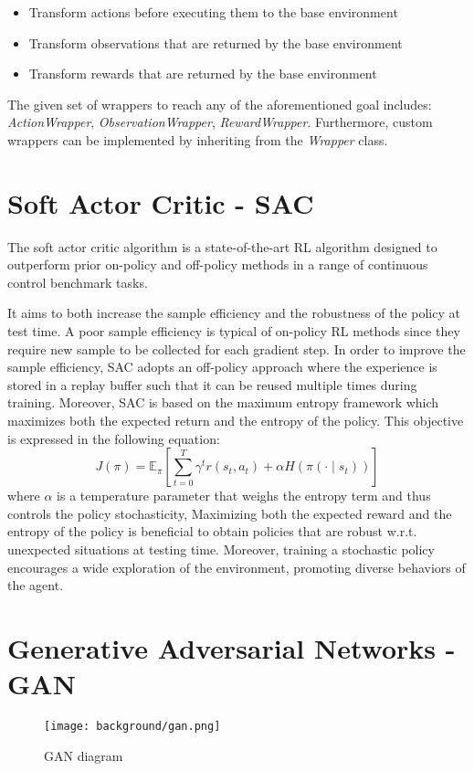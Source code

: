 \begin{itemize}
  \item Transform actions before executing them to the base environment
  \item Transform observations that are returned by the base environment
  \item Transform rewards that are returned by the base environment
\end{itemize}
The given set of wrappers to reach any of the aforementioned goal includes: \textit{ActionWrapper}, \textit{ObservationWrapper}, \textit{RewardWrapper}. Furthermore, custom wrappers can be implemented by inheriting from the \textit{Wrapper} class.

\section{Soft Actor Critic - SAC}
The soft actor critic algorithm \citep{art:sac} is a state-of-the-art RL algorithm designed to outperform prior on-policy and off-policy methods in a range of continuous control benchmark tasks. 

It aims to both increase the sample efficiency and the robustness of the policy at test time. A poor sample efficiency is typical of on-policy RL methods since they require new sample to be collected for each gradient step. In order to improve the sample efficiency, SAC adopts an off-policy approach where the experience is stored in a replay buffer such that it can be reused multiple times during training. Moreover, SAC is based on the maximum entropy framework which maximizes both the expected return and the entropy of the policy. This objective is expressed in the following equation:
\begin{equation}
  J(\pi)=\mathbb{E}_{\pi}[\sum _{t=0}^{T}\gamma ^{t}r(s_{t},a_{t})+\alpha H(\pi(\cdot \mid s_{t}))]
\end{equation}
where $\alpha$ is a temperature parameter that weighs the entropy term and thus controls the policy stochasticity, Maximizing both the expected reward and the entropy of the policy is beneficial to obtain policies that are robust w.r.t. unexpected situations at testing time. Moreover, training a stochastic policy encourages a wide exploration of the environment, promoting diverse behaviors of the agent.

\section{Generative Adversarial Networks - GAN}
\begin{wrapfigure}{r}{0.6\textwidth}
  \begin{center}
    \texttt{[image: background/gan.png]}
  \end{center}
  \caption{GAN diagram}
  \label{fig:gan}
\end{wrapfigure}

